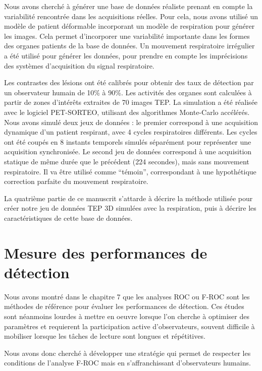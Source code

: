 Nous avons cherché à générer une base de données réaliste prenant en compte la variabilité rencontrée dans les acquisitions réelles. Pour cela, nous avons utilisé un modèle de patient déformable incorporant un modèle de respiration pour générer les images. Cela permet d'incorporer une variabilité importante dans les formes des organes patients de la base de données. Un mouvement respiratoire irrégulier a été utilisé pour générer les données, pour prendre en compte les imprécisions des systèmes d'acquisition du signal respiratoire. 


Les contrastes des lésions ont été calibrés pour obtenir des taux de détection par un observateur humain de 10\% à 90\%. Les activités des organes sont calculées à partir de zones d'intérêts extraites de 70 images TEP. La simulation a été réalisée avec le logiciel PET-SORTEO, utilisant des algorithmes Monte-Carlo accélérés. Nous avons simulé deux jeux de données : le premier correspond à une acquisition dynamique d'un patient respirant, avec 4 cycles respiratoires différents. Les cycles ont été coupés en 8 instants temporels simulés séparément pour représenter une acquisition synchronisée. Le second jeu de données correspond à une acquisition statique de même durée que le précédent (224 secondes), mais sans mouvement respiratoire. Il va être utilisé comme ``témoin'', correspondant à une hypothétique correction parfaite du mouvement respiratoire.

La quatrième partie de ce manuscrit s'attarde à décrire la méthode utilisée pour créer notre jeu de données TEP 3D simulées avec la respiration, puis à décrire les caractéristiques de cette base de données.

\section{Mesure des performances de détection}

Nous avons montré dans le chapitre 7 que les analyses ROC ou F-ROC sont les méthodes de référence pour évaluer les performances de détection. Ces études sont néanmoins lourdes à mettre en oeuvre lorsque l'on cherche à optimiser des paramètres et requierent la participation active d'observateurs, souvent difficile à mobiliser lorsque les tâches de lecture sont longues et répétitives.

Nous avons donc cherché à développer une stratégie qui permet de respecter les conditions de l'analyse F-ROC mais en s'affranchissant d'observateurs humains.

